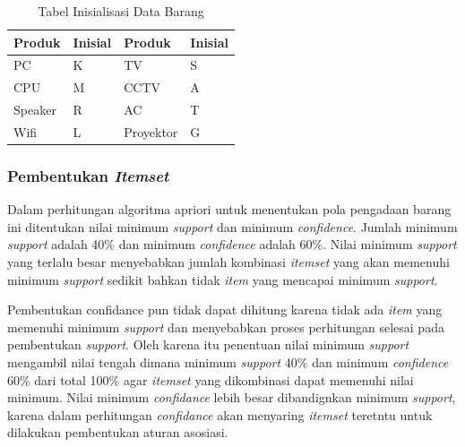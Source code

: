 \begin{table}[!h]
\caption{Tabel Inisialisasi Data Barang}
\begin{center}
\begin{tabular}{|l|l|l|l|}
\hline
Produk  & Inisial & Produk    & Inisial \\ \hline
PC      & K       & TV        & S       \\ \hline
CPU     & M       & CCTV      & A       \\ \hline
Speaker & R       & AC        & T       \\ \hline
Wifi    & L       & Proyektor & G       \\ \hline
\end{tabular}
\end{center}
\end{table}

\subsubsection{Pembentukan \textit{Itemset}}
\par Dalam perhitungan algoritma apriori untuk menentukan pola pengadaan barang ini ditentukan  nilai minimum \textit{support} dan minimum \textit{confidence}. Jumlah minimum \textit{support} adalah 40\% dan minimum \textit{confidence} adalah 60\%.
Nilai minimum \textit{support} yang terlalu besar menyebabkan jumlah kombinasi \textit{itemset} yang akan memenuhi minimum \textit{support} sedikit bahkan tidak \textit{item} yang mencapai minimum \textit{support}.
\par
Pembentukan confidance pun tidak dapat dihitung karena tidak ada \textit{item} yang memenuhi minimum \textit{support} dan menyebabkan proses perhitungan selesai pada pembentukan \textit{support}. Oleh karena itu penentuan nilai minimum \textit{support} mengambil nilai tengah dimana minimum \textit{support}  40\% dan minimum \textit{confidence} 60\% dari total 100\% agar \textit{itemset} yang dikombinasi dapat memenuhi nilai minimum.
Nilai minimum \textit{confidance} lebih besar dibandignkan minimum \textit{support}, karena dalam perhitungan \textit{confidance} akan menyaring \textit{itemset} teretntu untuk dilakukan pembentukan aturan asosiasi.


